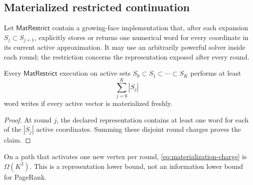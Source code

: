 \subsection{Materialized restricted continuation}

Let $\mathsf{MatRestrict}$ contain a growing-face implementation that, after
each expansion $S_j\subset S_{j+1}$, explicitly stores or returns one numerical
word for every coordinate in its current active approximation.  It may use an
arbitrarily powerful solver inside each round; the restriction concerns the
representation exposed after every round.

\begin{lemma}
\label{lem:materialization}
Every $\mathsf{MatRestrict}$ execution on active sets
$S_0\subset S_1\subset\cdots\subset S_K$ performs at least
\begin{equation}
 \sum_{j=0}^K|S_j|
 \label{eq:materialization-charge}
\end{equation}
word writes if every active vector is materialized freshly.
\end{lemma}

\begin{proof}
At round $j$, the declared representation contains at least one word for each
of the $|S_j|$ active coordinates.  Summing these disjoint round charges proves
the claim.
\end{proof}

On a path that activates one new vertex per round,
\cref{eq:materialization-charge} is $\Omega(K^2)$.  This is a representation
lower bound, not an information lower bound for PageRank.
